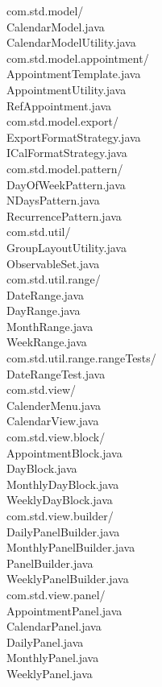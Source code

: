 \documentclass[a4paper,12pt]{article}
\newcommand{\tab}{\hspace*{3em}}
\begin{document}
com.std.model/\\
\tab CalendarModel.java\\
\tab CalendarModelUtility.java\\
\tab com.std.model.appointment/\\
\tab \tab AppointmentTemplate.java\\
\tab \tab AppointmentUtility.java\\
\tab \tab RefAppointment.java\\
\tab com.std.model.export/\\
\tab \tab ExportFormatStrategy.java\\
\tab \tab ICalFormatStrategy.java\\
\tab com.std.model.pattern/\\
\tab \tab DayOfWeekPattern.java\\
\tab \tab NDaysPattern.java\\
\tab \tab RecurrencePattern.java\\
com.std.util/\\
\tab GroupLayoutUtility.java\\
\tab ObservableSet.java\\
\tab com.std.util.range/\\
\tab \tab DateRange.java\\
\tab \tab DayRange.java\\
\tab \tab MonthRange.java\\
\tab \tab WeekRange.java\\
\tab \tab com.std.util.range.rangeTests/\\
\tab \tab \tab DateRangeTest.java\\
com.std.view/\\
\tab CalenderMenu.java\\
\tab CalendarView.java\\
\tab com.std.view.block/\\
\tab \tab AppointmentBlock.java\\
\tab \tab DayBlock.java\\
\tab \tab MonthlyDayBlock.java\\
\tab \tab WeeklyDayBlock.java\\
\tab com.std.view.builder/\\
\tab \tab DailyPanelBuilder.java\\
\tab \tab MonthlyPanelBuilder.java\\
\tab \tab PanelBuilder.java\\
\tab \tab WeeklyPanelBuilder.java\\
\tab com.std.view.panel/\\
\tab \tab AppointmentPanel.java\\
\tab \tab CalendarPanel.java\\
\tab \tab DailyPanel.java\\
\tab \tab MonthlyPanel.java\\
\tab \tab WeeklyPanel.java\\
\end{document}
